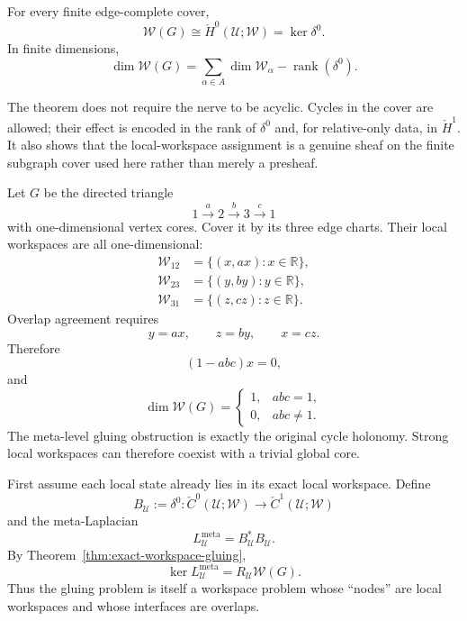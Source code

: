 \begin{corollary}\label{cor:zeroth-descent}
For every finite edge-complete cover,
\[
\boxed{
\mathscr W(G)
\cong
\check H^0(\mathcal U;\mathscr W)
=
\ker\delta^0.
}
\]
In finite dimensions,
\[
\boxed{
\dim\mathscr W(G)
=
\sum_{\alpha\in A}\dim\mathscr W_\alpha
-
\operatorname{rank}(\delta^0).
}
\]
\end{corollary}

The theorem does not require the nerve to be acyclic. Cycles in the cover are
allowed; their effect is encoded in the rank of \(\delta^0\) and, for
relative-only data, in \(\check H^1\). It also shows that the local-workspace
assignment is a genuine sheaf on the finite subgraph cover used here rather
than merely a presheaf.


Let \(G\) be the directed triangle
\[
1\xrightarrow{\ a\ }2
\xrightarrow{\ b\ }3
\xrightarrow{\ c\ }1
\]
with one-dimensional vertex cores. Cover it by its three edge charts. Their
local workspaces are all one-dimensional:
\[
\begin{aligned}
\mathscr W_{12}&=\{(x,ax):x\in\mathbb R\},\\
\mathscr W_{23}&=\{(y,by):y\in\mathbb R\},\\
\mathscr W_{31}&=\{(z,cz):z\in\mathbb R\}.
\end{aligned}
\]
Overlap agreement requires
\[
y=ax,
\qquad
z=by,
\qquad
x=cz.
\]
Therefore
\[
(1-abc)x=0,
\]
and
\[
\boxed{
\dim\mathscr W(G)
=
\begin{cases}
1,&abc=1,\\
0,&abc\neq1.
\end{cases}
}
\]
The meta-level gluing obstruction is exactly the original cycle holonomy.
Strong local workspaces can therefore coexist with a trivial global core.



First assume each local state already lies in its exact local workspace. Define
\[
B_{\mathcal U}
:=
\delta^0:
\check C^0(\mathcal U;\mathscr W)
\longrightarrow
\check C^1(\mathcal U;\mathscr W)
\]
and the meta-Laplacian
\[
\boxed{
L_{\mathcal U}^{\mathrm{meta}}
=
B_{\mathcal U}^*B_{\mathcal U}.
}
\]
By Theorem~\ref{thm:exact-workspace-gluing},
\[
\boxed{
\ker L_{\mathcal U}^{\mathrm{meta}}
=
R_{\mathcal U}\mathscr W(G).
}
\]
Thus the gluing problem is itself a workspace problem whose ``nodes'' are
local workspaces and whose interfaces are overlaps.

